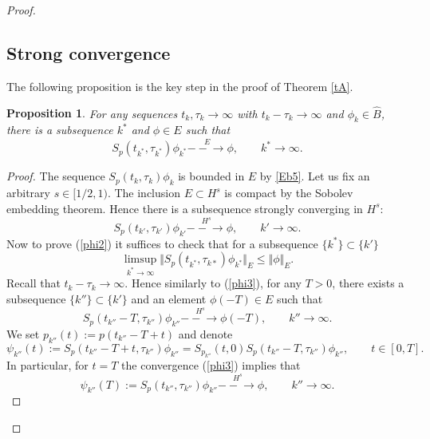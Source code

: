 \documentclass[11pt]{article}
\newtheorem{proposition}[theorem]{Proposition}
\newcommand{\st}{\stackrel}
\newcommand{\toE}{\st{E}{-\!\!\!-\!\!\!\to}}
\newcommand{\toHs}{\st{H^s}{-\!\!\!-\!\!\!\to}}
\newcommand{\5}{{\hspace{0.5mm}}}
\numberwithin{equation}{section}
\newcommand{\la}{\label}
\newcommand{\be}{\begin{equation}}
\newcommand{\ee}{\end{equation}}
\newcommand{\bp}{\begin{proposition}}
\newcommand{\ep}{\end{proposition}}
\numberwithin{equation}{section}
\begin{document}
\begin{proof}
\subsection{Strong convergence}
The following proposition is the key step in the proof of Theorem \ref{tA}.
\bp\la{pA}
For any sequences $ t_k,\tau_k\to\infty$ with $t_k-\tau_k\to\infty$ and $\phi_k\in \hat B$, there is a subsequence $k^*$ and $\phi\in E$ such that
\be\la{phi2}
S_p(t_{k^*},\tau_{k^*})\phi_{k^*}\toE \phi,\qquad k^*\to\infty.
\ee
\ep
\begin{proof}
The sequence $S_p(t_k,\tau_k)\phi_k$ is bounded in $E$ by \eqref{Eb5}.
Let us fix an arbitrary $s\in[1/2,1)$.
The inclusion $E\subset H^s$ is compact
 by the Sobolev embedding theorem.
Hence there is a subsequence strongly converging in $H^s$:
\be\la{phi3}
S_p(t_{k'},\tau_{k'})\phi_{k'}\toHs \phi,\qquad k'\to\infty.
\ee
Now to prove (\ref{phi2}) it suffices to check that for a subsequence $\{k^*\}
\subset \{k'\}$
\be\la{phi}
\limsup_{k^*\to\infty}\Vert S_p(t_{k^*},\tau_{k*})\phi_{k^*}\Vert_E\le \Vert\phi\Vert_E.
\ee
Recall that $t_k-\tau_k\to\infty$.
Hence similarly to (\ref{phi3}), for any $T>0$, there exists a subsequence
 $\{k''\}\subset\{k'\}$ and an element $\phi(-T)\in E$ such that
\be\la{phi3T}
S_p(t_{k''}-T,\tau_{k''})\phi_{k''}\toHs \phi(-T),\qquad k''\to\infty.
\ee
We set  $p_{k''}(t):=p(t_{k''}-T+t)$ and denote
\be\la{psi''}
\psi_{k''}(t):=S_p(t_{k''}-T+t,\tau_{k''})\phi_{k''}=S_{p_{k''}}(t,0)S_p(t_{k''}-T,\tau_{k''})\phi_{k''},\qquad t\in [0,T].
\ee
In particular, for $t=T$
 the convergence (\ref{phi3})
implies that
\be\la{phi50}
\psi_{k''}(T):=S_p(t_{k''},\tau_{k''})\phi_{k''}\toHs \phi,\qquad k''\to\infty.
\ee


\end{proof}
\end{proof}
\end{document}
